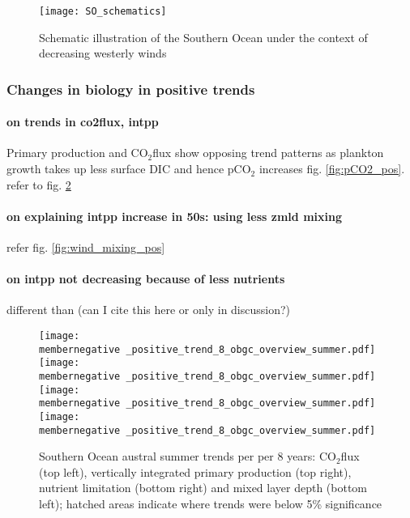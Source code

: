 \documentclass[12pt]{article}
\newcommand{\membernegative}{m143_1995_2002}
\begin{document}
\begin{figure}[h!]
	\centering
\texttt{[image: SO\_schematics]}
	\caption{Schematic illustration of the Southern Ocean under the context of decreasing westerly winds}
	\label{fig:schematics_weaker_winds}
\end{figure}



\clearpage

\subsubsection{Changes in biology in positive trends}

\paragraph{on trends in co2flux, intpp} Primary production and CO$_2$flux show opposing trend patterns as plankton growth takes up less surface DIC and hence pCO$_2$ increases fig. \ref{fig:pCO2_pos}. refer to fig. \ref{fig:co2flux_intpp_pos} 

\paragraph{on explaining intpp increase in 50s: using less zmld mixing} refer fig. \ref{fig:wind_mixing_pos}

\paragraph{on intpp not decreasing because of less nutrients}  different than \citep{Lovenduski2005} (can I cite this here or only in discussion?)

\begin{figure}[h!]
	\texttt{[image: \\membernegative \_positive\_trend\_8\_obgc\_overview\_summer.pdf]} %
	\texttt{[image: \\membernegative \_positive\_trend\_8\_obgc\_overview\_summer.pdf]} %
	\texttt{[image: \\membernegative \_positive\_trend\_8\_obgc\_overview\_summer.pdf]} %
	\texttt{[image: \\membernegative \_positive\_trend\_8\_obgc\_overview\_summer.pdf]} %
	\caption{Southern Ocean austral summer trends per per 8 years: CO$_2$flux (top left), vertically integrated primary production (top right), nutrient limitation (bottom right) and mixed layer depth (bottom left); hatched areas indicate where trends were below 5\% significance}
\label{fig:co2flux_intpp_pos}
\end{figure}
\end{document}
